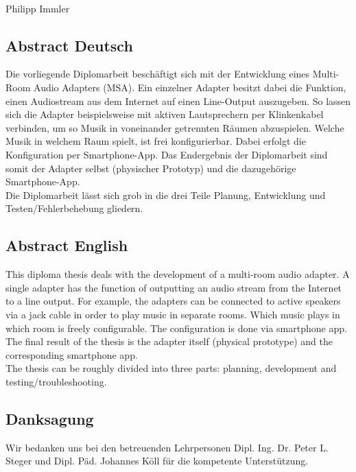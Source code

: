 \documentclass[11pt, twoside]{article}
\begin{document}
\vspace{25mm}

\noindent
\begin{flushright}
    \begin{minipage}[c]{5cm}
        \centering \dotfill \\
        Philipp Immler
    \end{minipage}
\end{flushright}

\newpage

\subsection{Abstract Deutsch}
Die vorliegende Diplomarbeit beschäftigt sich mit der Entwicklung eines Multi-Room Audio Adapters (MSA). Ein einzelner Adapter besitzt dabei die Funktion, einen Audiostream aus dem Internet auf einen Line-Output auszugeben. So lassen sich die Adapter beispielsweise mit aktiven Lautsprechern per Klinkenkabel verbinden, um so Musik in voneinander getrennten Räumen abzuspielen. Welche Musik in welchem Raum spielt, ist frei konfigurierbar. Dabei erfolgt die Konfiguration per Smartphone-App. Das Endergebnis der Diplomarbeit sind somit der Adapter selbst (physischer Prototyp) und die dazugehörige Smartphone-App. \newline \\
Die Diplomarbeit lässt sich grob in die drei Teile Planung, Entwicklung und Testen/Fehlerbehebung gliedern.
\subsection{Abstract English}
This diploma thesis deals with the development of a multi-room audio adapter. A single adapter has the function of outputting an audio stream from the Internet to a line output. For example, the adapters can be connected to active speakers via a jack cable in order to play music in separate rooms. Which music plays in which room is freely configurable. The configuration is done via smartphone app. The final result of the thesis is the adapter itself (physical prototype) and the corresponding smartphone app. \newline \\
The thesis can be roughly divided into three parts: planning, development and testing/troubleshooting.
\subsection{Danksagung}
Wir bedanken uns bei den betreuenden Lehrpersonen Dipl. Ing. Dr. Peter L. Steger und Dipl. Päd. Johannes Köll für die kompetente Unterstützung.
\end{document}
